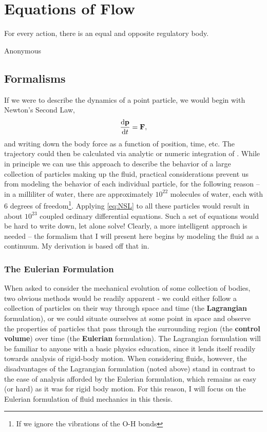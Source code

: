\setcounter{secnumdepth}{3}
\chapter{Equations of Flow}
    	 	\epigraph{For every action, there is an equal and opposite regulatory body.}{Anonymous}
\section{Formalisms}
If we were to describe the dynamics of a point particle, we would begin with Newton's Second Law,
\begin{equation}\label{eq:NSL}
\der{1}{\Vector{p}}{t} = \Vector{F}, 
\end{equation}
and writing down the body force as a function of position, time, etc. The trajectory could then be calculated via analytic or numeric integration of . While in principle we can use this approach to describe the behavior of a large collection of particles making up the fluid, practical considerations prevent us from modeling the behavior of each individual particle, for the following reason -- in a milliliter of water, there are approximately $10^{22}$ molecules of water, each with 6 degrees of freedom\footnote{If we ignore the vibrations of the O-H bonds}. Applying \eqref{eq:NSL} to all these particles would result in about $10^{23}$ coupled ordinary differential equations. Such a set of equations would be hard to write down, let alone solve! Clearly, a more intelligent approach is needed -- the formalism that I will present here begins by modeling the fluid as a continuum. My derivation is based off that in. \\

\subsection{The Eulerian Formulation}

When asked to consider the mechanical evolution of some collection of bodies, two obvious methods would be readily apparent - we could either follow a collection of particles on their way through space and time (the {\bf Lagrangian} formulation), or we could situate ourselves at some point in space and observe the properties of particles that pass through the surrounding region (the {\bf control volume}) over time (the {\bf Eulerian} formulation). The Lagrangian formulation will be familiar to anyone with a basic physics education, since it lends itself readily towards analysis of rigid-body motion. When considering fluids, however, the disadvantages of the Lagrangian formulation (noted above) stand in contrast to the ease of analysis afforded by the Eulerian formulation, which remains as easy (or hard) as it was for rigid body motion. For this reason, I will focus on the Eulerian formulation of fluid mechanics in this thesis. 

